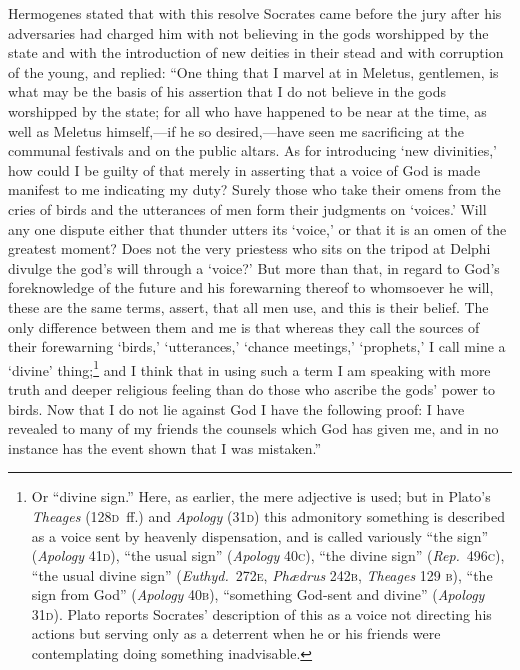 \documentclass[12pt]{article}
\begin{document}
Hermogenes stated that with this resolve Socrates came before the jury after
his adversaries had charged him with not believing in the gods worshipped by
the state and with the introduction of new deities in their stead and with
corruption of the young, and replied: ``One thing that I marvel at in Meletus,
gentlemen, is what may be the basis of his assertion that I do not believe in
the gods worshipped by the state; for all who have happened to be near at the
time, as well as Meletus himself,---if he so desired,---have seen me
sacrificing at the communal festivals and on the public altars. As for
introducing `new divinities,' how could I be guilty of that merely in
asserting that a voice of God is made manifest to me indicating my duty? Surely
those who take their omens from the cries of birds and the utterances of men
form their judgments on `voices.' Will any one dispute either that thunder
utters its `voice,' or that it is an omen of the greatest moment? Does not the
very priestess who sits on the tripod at Delphi divulge the god's will through
a `voice?' But more than that, in regard to God's foreknowledge of the future
and his forewarning thereof to whomsoever he will, these are the same terms,
assert, that all men use, and this is their belief. The only difference between
them and me is that whereas they call the sources of their forewarning
`birds,' `utterances,' `chance meetings,' `prophets,' I call mine a `divine'
thing;\footnote{Or ``divine sign.'' Here, as earlier, the mere adjective is
used; but in Plato's \textit{Theages} (128\textsc{d}~ff.) and \textit{Apology}
(31\textsc{d}) this admonitory something is described as a voice sent by
heavenly dispensation, and is called variously ``the sign'' (\textit{Apology}
41\textsc{d}), ``the usual sign'' (\textit{Apology} 40\textsc{c}), ``the divine
sign'' (\textit{Rep.}~496\textsc{c}), ``the usual divine sign''
(\textit{Euthyd.}~272\textsc{e}, \textit{Ph{\ae}drus} 242\textsc{b},
\textit{Theages} 129 \textsc{b}), ``the sign from God'' (\textit{Apology}
40\textsc{b}), ``something God-sent and divine'' (\textit{Apology}
31\textsc{d}). Plato reports Socrates' description of this as a voice not
directing his actions but serving only as a deterrent when he or his friends
were contemplating doing something inadvisable.} and I think that in using such
a term I am speaking with more truth and deeper religious feeling than do those
who ascribe the gods' power to birds. Now that I do not lie against God I have
the following proof: I have revealed to many of my friends the counsels which
God has given me, and in no instance has the event shown that I was mistaken.''
\end{document}
